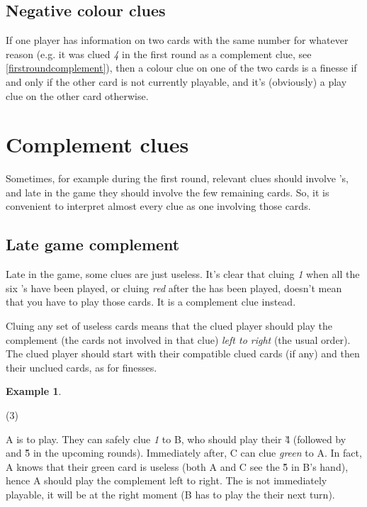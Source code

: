 \documentclass[a4paper]{article}
\theoremstyle{plain}
\theoremstyle{definition}
\newtheorem{example}[theorem]{Example}
\begin{document}
\subsection{Negative colour clues}

If one player has information on two cards with the same number for whatever reason (e.g. it was clued \textit{4} in the first round as a complement clue, see \ref{firstroundcomplement}), then a colour clue on one of the two cards is a finesse if and only if the other card is not currently playable, and it's (obviously) a play clue on the other card otherwise.

\section{Complement clues}

Sometimes, for example during the first round, relevant clues should involve 's, and late in the game they should involve the few remaining cards. So, it is convenient to interpret almost every clue as one involving those cards.

\subsection{Late game complement}

Late in the game, some clues are just useless. It's clear that cluing \textit{1} when all the six 's have been played, or cluing \textit{red} after the  has been played, doesn't mean that you have to play those cards. It is a complement clue instead.

Cluing any set of useless cards means that the clued player should play the complement (the cards not involved in that clue) \textit{left to right} (the usual order). The clued player should start with their compatible clued cards (if any) and then their unclued cards, as for finesses.

\begin{example}
	\hfill
	\begin{tasks}(3)
		\task[+]      
		\task[A]    
		\task[B]    
		\task[C]    
		\task[D]    
		\task[E]    
	\end{tasks}
	
	A is to play. They can safely clue \textit{1} to B, who should play their \G{4} (followed by  and \G{5} in the upcoming rounds). Immediately after, C can clue \textit{green} to A. In fact, A knows that their green card is useless (both A and C see the \G{5} in B's hand), hence A should play the complement left to right. The  is not immediately playable, it will be at the right moment (B has to play the  their next turn).
\end{example}
\end{document}

